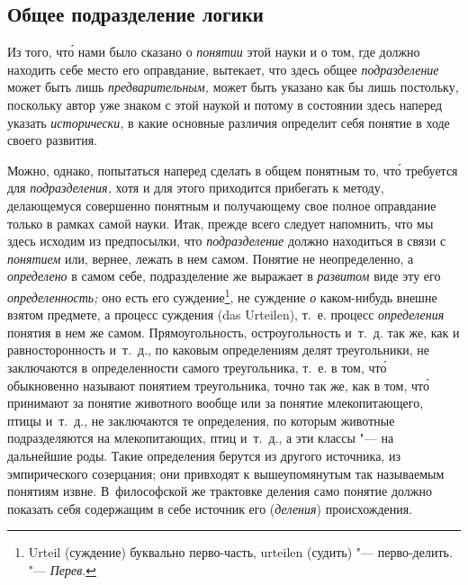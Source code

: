 \subsection[\hspace{8mm}Общее подразделение логики]{Общее подразделение логики}
Из того, чт\'{о} нами было сказано о
{\em понятии} этой науки и о том, где должно находить
себе место его оправдание, вытекает, что здесь общее
{\em подразделение} может быть лишь
{\em предварительным,} может быть указано как бы лишь
постольку, поскольку автор уже знаком с этой наукой и потому в состоянии
здесь наперед указать {\em исторически,} в какие
основные различия определит себя понятие в ходе своего развития.

Можно, однако, попытаться наперед сделать в общем понятным то, чт\'{о} требуется
для {\em подразделения,} хотя и для этого приходится
прибегать к методу, делающемуся совершенно понятным и получающему свое
полное оправдание только в рамках самой науки. Итак, прежде всего следует
напомнить, что мы здесь исходим из предпосылки, что
{\em подразделение} должно находиться в связи с
{\em понятием} или, вернее, лежать в нем самом. Понятие
не неопределенно, а {\em определено} в самом себе,
подразделение же выражает в {\em развитом} виде эту его
{\em определенность;} оно есть его суждение\footnote{
Urteil (суждение) буквально перво-часть, urteilen (судить) "--- перво-делить.
"--- {\em Перев}.}, не суждение {\em о} каком-нибудь
внешне взятом предмете, а процесс суждения (das Urteilen), т.~е. процесс
{\em определения} понятия в нем же самом.
Прямоугольность, остроугольность и~т.~д. так же, как и равносторонность
и~т.~д., по каковым определениям делят треугольники, не заключаются в
определенности самого треугольника, т.~е. в том, чт\'{о} обыкновенно называют
понятием треугольника, точно так же, как в том, чт\'{о} принимают за понятие
животного вообще или за понятие млекопитающего, птицы и~т.~д., не
заключаются те определения, по которым животные подразделяются на
млекопитающих, птиц и~т.~д., а эти классы "--- на дальнейшие роды. Такие
определения берутся из другого источника, из эмпирического созерцания; они
привходят к вышеупомянутым так называемым понятиям извне. В~философской же
трактовке деления само понятие должно показать себя содержащим в себе
источник его ({\em деления}) происхождения.

